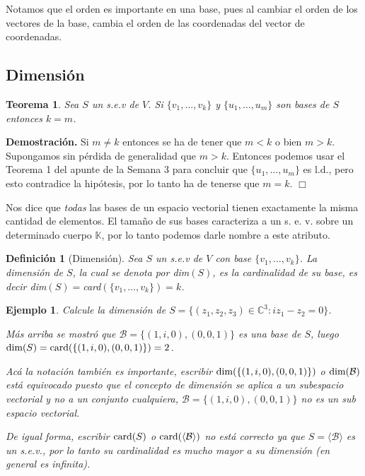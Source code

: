 \documentclass[12pt]{book}
\newtheorem{teo}{Teorema}
\newtheorem{defi}{Definici\'on}
\newtheorem{ejem}{Ejemplo}
\def\C{\mathbb{C}}
\def\K{\mathbb{K}}
\def\B{\mathcal{B}}
\def\card{\textup{card}}
\def\dim{\textup{dim}}
\begin{document}
Notamos que el orden es importante en una base, pues al cambiar el orden de los vectores de la base, cambia el orden de las coordenadas del vector de coordenadas.



\subsection{Dimensi\'on}


\begin{teo}
Sea $S$ un s.e.v de $V$. Si $\{v_1,\dots,v_k\}$ y $\{u_1,\dots,u_m\}$ son bases de $S$ entonces $k=m$.
\end{teo}
    {\bf Demostración.}
    Si $m\not=k$ entonces se ha de tener que $m<k$ o bien $m>k$.
    Supongamos sin pérdida de generalidad que $m>k$. Entonces podemos usar el Teorema 1 del apunte de la Semana 3 para concluir que $\{u_1,\dots,u_m\}$ es l.d., pero esto contradice la hipótesis, por lo tanto ha de tenerse que $m=k$.
    \hfill $\Box$
    

Nos dice que \emph{todas} las bases de un espacio vectorial tienen exactamente la misma cantidad de elementos.
El tama\~no de sus bases caracteriza a un s. e. v. sobre un determinado cuerpo $\K$, por lo tanto podemos darle nombre a este atributo.

\begin{defi}[Dimensi\'on] Sea $S$ un s.e.v de $V$ con base $\{v_1,\dots,v_k\}$. La dimensi\'on de $S$, la cual se denota por {\em dim}$(S)$, es la cardinalidad de su base, es decir {\em dim}$(S)=${\em card}$(\{v_1,\dots,v_k\})=k$. 
\end{defi}

\begin{ejem}
Calcule la dimensi\'on de $S=\{(z_1,z_2,z_3)\in\C^3: iz_1-z_2=0\}$.

{\em Más arriba se mostr\'o que $\B=\{(1,i,0),(0,0,1)\}$ es una base de $S$, luego $\dim(S)=\card(\{(1,i,0),(0,0,1)\})=2$.
 
 Ac\'a la notaci\'on tambi\'en es importante, escribir $\dim(\{(1,i,0),(0,0,1)\})$ o $\dim(\B)$ est\'a equivocado puesto que el concepto de dimensi\'on se aplica a un subespacio vectorial y no a un conjunto cualquiera, $\B=\{(1,i,0),(0,0,1)\}$ no es un sub espacio vectorial.
 
De igual forma, escribir $\card(S)$ o  $\card(\langle\B\rangle)$ no est\'a correcto ya que $S=\langle\B\rangle$ es un s.e.v., por lo tanto su cardinalidad es mucho mayor a su dimensión (en general es infinita).}
\end{ejem}
\end{document}
